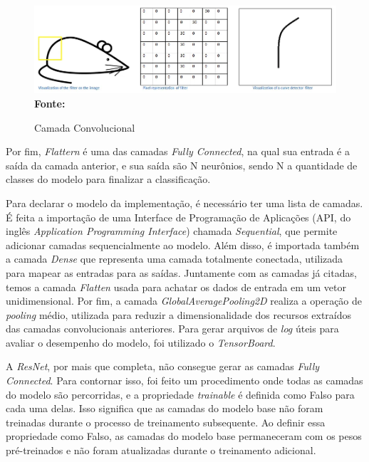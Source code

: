 \begin{figure}[ht]
 	\centering	
 	\caption[\hspace{0.1cm}Grade Computacional.]{Camada Convolucional}
 	\vspace{-0.4cm}
 	\includegraphics[width=1\textwidth]{figuras/conv.png}
 	\captionsetup{justification=centering}
	\vspace{-0.2cm}
     \\\textbf{\footnotesize Fonte: \cite{cnns}}
	\label{fig:conv2}
\end{figure}

Por fim, \textit{Flattern} é uma das camadas \textit{Fully Connected}, na qual sua entrada é a saída da camada anterior, e sua saída são N neurônios, sendo N a quantidade de classes do modelo para finalizar a classificação.


Para declarar o modelo da implementação, é necessário ter uma lista de camadas. É feita a importação de uma Interface de Programação de Aplicações (API, do inglês \textit{Application Programming Interface}) chamada \textit{Sequential}, que permite adicionar camadas sequencialmente ao modelo. Além disso, é importada também a camada \textit{Dense} que representa uma camada totalmente conectada, utilizada para mapear as entradas para as saídas. Juntamente com as camadas já citadas, temos a camada \textit{Flatten} usada para achatar os dados de entrada em um vetor unidimensional. Por fim, a camada \textit{GlobalAveragePooling2D} realiza a operação de \textit{pooling} médio, utilizada para reduzir a dimensionalidade dos recursos extraídos das camadas convolucionais anteriores. Para gerar arquivos de \textit{log} úteis para avaliar o desempenho do modelo, foi utilizado o \textit{TensorBoard}.

A \textit{ResNet}, por mais que completa, não consegue gerar as camadas \textit{Fully Connected}. Para contornar isso, foi feito um procedimento onde todas as camadas do modelo são percorridas, e a propriedade \textit{trainable} é definida como Falso para cada uma delas. Isso significa que as camadas do modelo base não foram treinadas durante o processo de treinamento subsequente. Ao definir essa propriedade como Falso, as camadas do modelo base permaneceram com os pesos pré-treinados e não foram atualizadas durante o treinamento adicional. 

